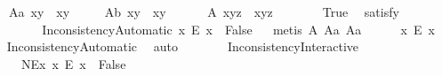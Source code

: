 \begin{isabellebody}
\ \ \ A{}a{\isacharcolon}\ {\isachardoublequoteopen}{\isasymbox}{\isacharparenleft}x\isactrlbold {\isasymcdot}y{\isacharparenright}\ {\isasymcong}\ {\isasymbox}{\isacharparenleft}x\isactrlbold {\isasymcdot}{\isacharparenleft}{\isasymbox}y{\isacharparenright}{\isacharparenright}{\isachardoublequoteclose}\ \ \isanewline
\ \ \ A{}b{\isacharcolon}\ {\isachardoublequoteopen}{\isacharparenleft}x\isactrlbold {\isasymcdot}y{\isacharparenright}{\isasymbox}\ {\isasymcong}\ {\isacharparenleft}{\isacharparenleft}x{\isasymbox}{\isacharparenright}\isactrlbold {\isasymcdot}y{\isacharparenright}{\isasymbox}{\isachardoublequoteclose}\ \ \isanewline
\ \ \ \ A{}{\isacharcolon}\ {\isachardoublequoteopen}x\isactrlbold {\isasymcdot}{\isacharparenleft}y\isactrlbold {\isasymcdot}z{\isacharparenright}\ {\isasymcong}\ {\isacharparenleft}x\isactrlbold {\isasymcdot}y{\isacharparenright}\isactrlbold {\isasymcdot}z{\isachardoublequoteclose}\isanewline
\ \ \isanewline
\ \ \ \isamarkupfalse%
\ True\ \isamarkupfalse%
\ {\isacharbrackleft}satisfy{\isacharbrackright}%
\isadelimproof
\ %
\endisadelimproof
%
\isatagproof
{}\isamarkupfalse%
\ %
%
\endisatagproof
{\isafoldproof}%
%
\isadelimproof
%
\endisadelimproof
\isanewline
\ \ \ \isanewline
\ \ \ \isamarkupfalse%
\ InconsistencyAutomatic{\isacharcolon}\ {\isachardoublequoteopen}{\isacharparenleft}{\isasymexists}x{\isachardot}\ \isactrlbold {\isasymnot}{\isacharparenleft}E\ x{\isacharparenright}{\isacharparenright}\ \isactrlbold {\isasymrightarrow}\ False{\isachardoublequoteclose}%
\isadelimproof
\ %
\endisadelimproof
%
\isatagproof
{}\isamarkupfalse%
\ {\isacharparenleft}metis\ A{}\ A{}a\ A{}a{\isacharparenright}\ %
%
\endisatagproof
{\isafoldproof}%
%
\isadelimproof
%
\endisadelimproof
\isanewline
\ \ \ \isamarkupfalse%
\ {\isachardoublequoteopen}{\isasymforall}x{\isachardot}\ E\ x{\isachardoublequoteclose}%
\isadelimproof
\ %
\endisadelimproof
%
\isatagproof
{}\isamarkupfalse%
\ InconsistencyAutomatic\ \isamarkupfalse%
\ auto%
\endisatagproof
{\isafoldproof}%
%
\isadelimproof
%
\endisadelimproof
\isanewline
\ \ \isanewline
\ \ \ \isamarkupfalse%
\ InconsistencyInteractive{\isacharcolon}\isanewline
\ \ \ \ \ NEx{\isacharcolon}\ {\isachardoublequoteopen}{\isasymexists}x{\isachardot}\ \isactrlbold {\isasymnot}{\isacharparenleft}E\ x{\isacharparenright}{\isachardoublequoteclose}\ \ False\ \isanewline

\end{isabellebody}
